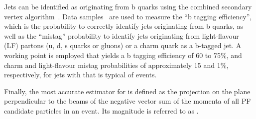 Jets can be identified as originating from b quarks using the combined
secondary vertex algorithm~\cite{Chatrchyan:2012jua}. Data
samples~\cite{CMS-PAS-BTV-15-001} are used to measure the ``b tagging
efficiency'', which is the probability to correctly identify jets
originating from b quarks, as well as the ``mistag'' probability to
identify jets originating from light-flavour (LF) partons (u, d, s
quarks or gluons) or a charm quark as a b-tagged jet. A working point
is employed that yields a b tagging efficiency of 60 to 75\%, and
charm and light-flavour mistag probabilities of approximately 15 and
1\%, respectively, for jets with \pt that is typical of \ttbar events.

Finally, the most accurate estimator for \ptvecmiss is defined as the
projection on the plane perpendicular to the beams of the negative
vector sum of the momenta of all PF candidate particles in an
event. Its magnitude is referred to as \ptmiss.

